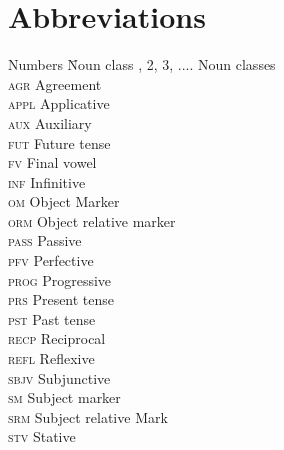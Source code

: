 \documentclass[output=paper,colorlinks,citecolor=brown]{langscibook}
\begin{document}
\section*{Abbreviations}
\begin{multicols}{2}
\begin{tabbing}
Numbers  \hspace{1ex} \= Noun class   , 2, 3, .... \> Noun classes \\
\textsc{agr}   \> Agreement    \\ 
\textsc{appl}  \> Applicative  \\ 
\textsc{aux}   \> Auxiliary    \\ 
\textsc{fut}   \> Future tense \\ 
\textsc{fv}    \> Final vowel  \\ 
\textsc{inf}   \> Infinitive   \\ 
\textsc{om}    \> Object Marker\\ 
\textsc{orm}   \> Object relative marker\\
\textsc{pass}  \> Passive\\
\textsc{pfv}   \> Perfective   \\ 
\textsc{prog}  \> Progressive  \\ 
\textsc{prs}   \> Present tense\\
\textsc{pst}   \> Past tense\\
\textsc{recp}  \> Reciprocal\\
\textsc{refl}  \> Reflexive\\
\textsc{sbjv}  \> Subjunctive\\
\textsc{sm}    \> Subject marker\\
\textsc{srm}   \> Subject relative Mark\\
\textsc{stv}   \> Stative \\
\end{tabbing}
\end{multicols}

{\sloppy\printbibliography[heading=subbibliography,notkeyword=this]}
\end{document}
